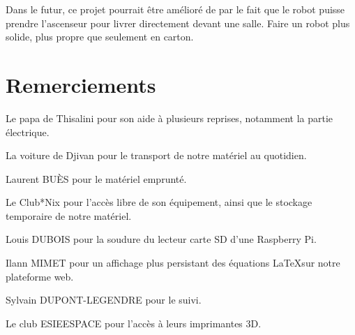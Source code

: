 \documentclass[a4paper,12pt]{report}  %
\begin{document}
Dans le futur, ce projet pourrait être amélioré de par le fait que le robot puisse prendre l’ascenseur pour livrer directement devant une salle. Faire un robot plus solide, plus propre que seulement en carton.



\pagebreak
\section{Remerciements}
Le papa de Thisalini pour son aide à plusieurs reprises, notamment la partie électrique.

La voiture de Djivan pour le transport de notre matériel au quotidien. 

Laurent BUÈS pour le matériel emprunté. 

Le Club*Nix pour l’accès libre de son équipement, ainsi que le stockage temporaire de notre matériel. 

Louis DUBOIS pour la soudure du lecteur carte SD d’une Raspberry Pi. 

Ilann MIMET pour un affichage plus persistant des équations \LaTeX sur notre plateforme web. 

Sylvain DUPONT-LEGENDRE pour le suivi. 

Le club ESIEESPACE pour l'accès à leurs imprimantes 3D. 
\end{document}
